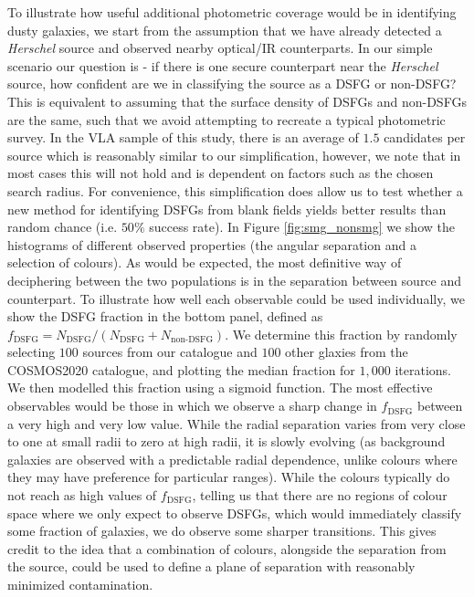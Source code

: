 To illustrate how useful additional photometric coverage would be in identifying dusty galaxies, we start from the assumption that we have already detected a \textit{Herschel} source and observed nearby optical/IR counterparts. In our simple scenario our question is - if there is one secure counterpart near the \textit{Herschel} source, how confident are we in classifying the source as a DSFG or non-DSFG? This is equivalent to assuming that the surface density of DSFGs and non-DSFGs are the same, such that we avoid attempting to recreate a typical photometric survey. In the VLA sample of this study, there is an average of $1.5$ candidates per source which is reasonably similar to our simplification, however, we note that in most cases this will not hold and is dependent on factors such as the chosen search radius. For convenience, this simplification does allow us to test whether a new method for identifying DSFGs from blank fields yields better results than random chance (i.e. $50\%$ success rate). In Figure \ref{fig:smg_nonsmg} we show the histograms of different observed properties (the angular separation and a selection of colours). As would be expected, the most definitive way of deciphering between the two populations is in the separation between source and counterpart. To illustrate how well each observable could be used individually, we show the DSFG fraction in the bottom panel, defined as $f_\textrm{DSFG} = N_\textrm{DSFG}/(N_\textrm{DSFG}+N_\textrm{non-DSFG})$. We determine this fraction by randomly selecting $100$ sources from our catalogue and $100$ other glaxies from the COSMOS2020 catalogue, and plotting the median fraction for $1,000$ iterations. We then modelled this fraction using a sigmoid function. The most effective observables would be those in which we observe a sharp change in $f_\textrm{DSFG}$ between a very high and very low value. While the radial separation varies from very close to one at small radii to zero at high radii, it is slowly evolving (as background galaxies are observed with a predictable radial dependence, unlike colours where they may have preference for particular ranges). While the colours typically do not reach as high values of $f_\textrm{DSFG}$, telling us that there are no regions of colour space where we only expect to observe DSFGs, which would immediately classify some fraction of galaxies, we do observe some sharper transitions. This gives credit to the idea that a combination of colours, alongside the separation from the source, could be used to define a plane of separation with reasonably minimized contamination.

